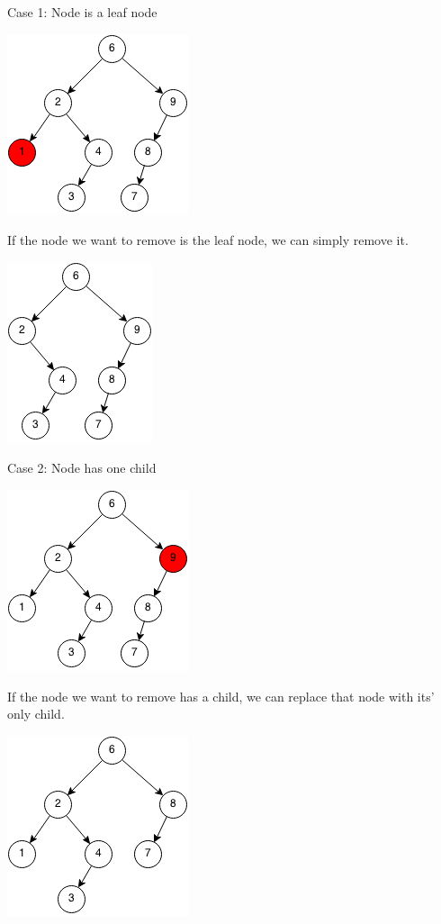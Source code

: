 \documentclass[11pt,oneside]{book}
\makeatletter
\def\maxwidth#1{\ifdim\Gin@nat@width>#1 #1\else\Gin@nat@width\fi}
\makeatother
\begin{document}
Case 1: Node is a leaf node

\includegraphics[width=\maxwidth{\textwidth}]{bst-rem-case11.png}

If the node we want to remove is the leaf node, we can simply remove it.

\includegraphics[width=\maxwidth{\textwidth}]{bst-rem-case12.png}

Case 2: Node has one child

\includegraphics[width=\maxwidth{\textwidth}]{bst-rem-case21.png}

If the node we want to remove has a child, we can replace that node with its' only child.

\includegraphics[width=\maxwidth{\textwidth}]{bst-rem-case22.png}
\end{document}
